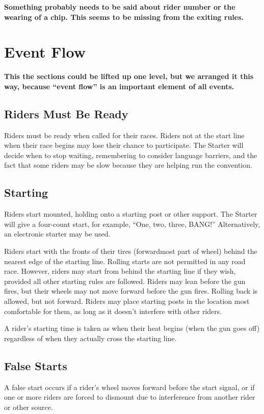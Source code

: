 \textbf{Something probably needs to be said about rider number or the wearing of a chip.  This seems to be missing from the exiting rules.}

\section{Event Flow}

\textbf{This the sections could be lifted up one level, but we arranged it this way, because ``event flow'' is an important element of all events.}

\subsection{Riders Must Be Ready}
Riders must be ready when called for their races.
Riders not at the start line when their race begins may lose their chance to participate.
The Starter will decide when to stop waiting, remembering to consider language barriers, and the fact that some riders may be slow because they are helping run the convention.

\subsection{Starting}
Riders start mounted, holding onto a starting post or other support.
The Starter will give a four-count start, for example, ``One, two, three, BANG!'' Alternatively, an electronic starter may be used.

Riders start with the fronts of their tires (forwardmost part of wheel) behind the nearest edge of the starting line.
Rolling starts are not permitted in any road race.
However, riders may start from behind the starting line if they wish, provided all other starting rules are followed.
Riders may lean before the gun fires, but their wheels may not move forward before the gun fires.
Rolling back is allowed, but not forward.
Riders may place starting posts in the location most comfortable for them, as long as it doesn't interfere with other riders.

A rider's starting time is taken as when their heat begins (when the gun goes off) regardless of when they actually cross the starting line.

\subsection{False Starts}
A false start occurs if a rider's wheel moves forward before the start signal, or if one or more riders are forced to dismount due to interference from another rider or other source.

